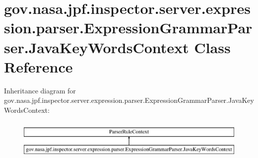 \hypertarget{classgov_1_1nasa_1_1jpf_1_1inspector_1_1server_1_1expression_1_1parser_1_1_expression_grammar_parser_1_1_java_key_words_context}{}\section{gov.\+nasa.\+jpf.\+inspector.\+server.\+expression.\+parser.\+Expression\+Grammar\+Parser.\+Java\+Key\+Words\+Context Class Reference}
\label{classgov_1_1nasa_1_1jpf_1_1inspector_1_1server_1_1expression_1_1parser_1_1_expression_grammar_parser_1_1_java_key_words_context}
Inheritance diagram for gov.\+nasa.\+jpf.\+inspector.\+server.\+expression.\+parser.\+Expression\+Grammar\+Parser.\+Java\+Key\+Words\+Context\+:\begin{figure}[H]
\begin{center}
\leavevmode
\includegraphics[height=1.931034cm]{classgov_1_1nasa_1_1jpf_1_1inspector_1_1server_1_1expression_1_1parser_1_1_expression_grammar_parser_1_1_java_key_words_context}
\end{center}
\end{figure}

